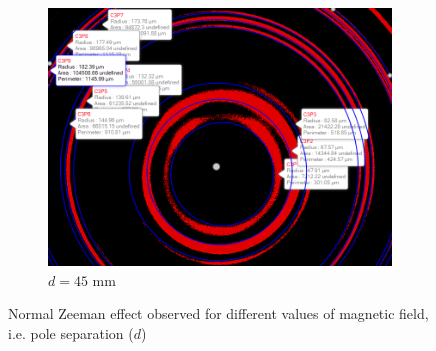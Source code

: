 \begin{figure}
\begin{subfigure}[b]{0.45\textwidth}
        \includegraphics[width=\textwidth]{images/45.png}
        \caption{$d=45$ mm}
    \end{subfigure}
    \hfill
    \caption{Normal Zeeman effect observed for different values of magnetic field, i.e. pole separation ($d$)}\label{f1}
\end{figure}

